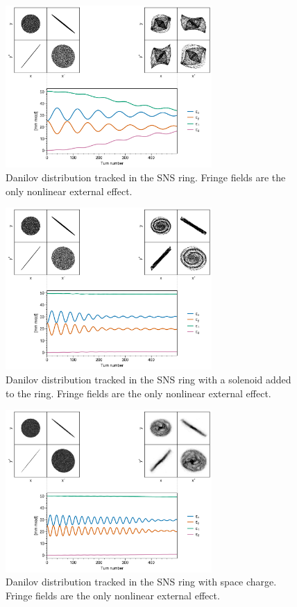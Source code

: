 %
\begin{figure}[!p]
    \centering
    \includegraphics[width=0.7\textwidth]{Images/chapter3/fringe.png}
    \caption{Danilov distribution tracked in the SNS ring. Fringe fields are the only nonlinear external effect.}
    \label{fig:fringe_a}
    \vspace*{3cm}
\end{figure}
%
%
\begin{figure}[!p]
    \centering
    \includegraphics[width=0.7\textwidth]{Images/chapter3/fringe_solenoid.png}
    \caption{Danilov distribution tracked in the SNS ring with a solenoid added to the ring. Fringe fields are the only nonlinear external effect.}
    \label{fig:fringe_b}
    \vspace*{3cm}
\end{figure}
%
%
\begin{figure}[!p]
    \centering
    \includegraphics[width=0.7\textwidth]{Images/chapter3/fringe_spacecharge.png}
    \caption{Danilov distribution tracked in the SNS ring with space charge. Fringe fields are the only nonlinear external effect.}
    \label{fig:fringe_c}
    \vspace*{3cm}
\end{figure}
